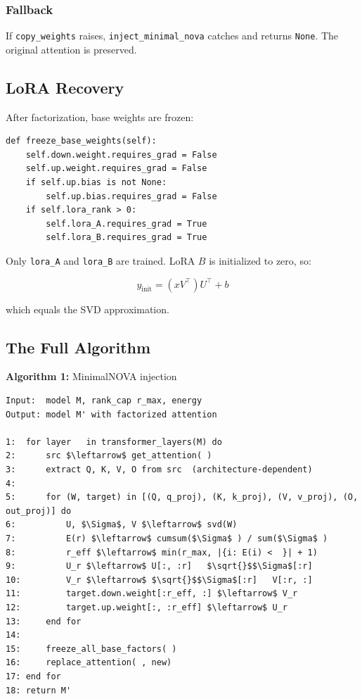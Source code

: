 \subsubsection{Fallback}

If \texttt{copy\_weights} raises, \texttt{inject\_minimal\_nova} catches and returns \texttt{None}. 
The original attention is preserved.

\subsection{LoRA Recovery}

After factorization, base weights are frozen:

\begin{lstlisting}
def freeze_base_weights(self):
    self.down.weight.requires_grad = False
    self.up.weight.requires_grad = False
    if self.up.bias is not None:
        self.up.bias.requires_grad = False
    if self.lora_rank > 0:
        self.lora_A.requires_grad = True
        self.lora_B.requires_grad = True
\end{lstlisting}

Only \texttt{lora\_A} and \texttt{lora\_B} are trained. LoRA $B$ is initialized to zero, so:

\[
y_{\text{init}} = (x V^\top) U^\top + b
\tag{4.8}
\]

which equals the SVD approximation.

\subsection{The Full Algorithm}

\textbf{Algorithm 1:} MinimalNOVA injection
\begin{lstlisting}
Input:  model M, rank_cap r_max, energy  
Output: model M' with factorized attention

1:  for layer   in transformer_layers(M) do
2:      src $\leftarrow$ get_attention( )
3:      extract Q, K, V, O from src  (architecture-dependent)
4:
5:      for (W, target) in [(Q, q_proj), (K, k_proj), (V, v_proj), (O, out_proj)] do
6:          U, $\Sigma$, V $\leftarrow$ svd(W)
7:          E(r) $\leftarrow$ cumsum($\Sigma$ ) / sum($\Sigma$ )
8:          r_eff $\leftarrow$ min(r_max, |{i: E(i) <  }| + 1)
9:          U_r $\leftarrow$ U[:, :r]   $\sqrt{}$$\Sigma$[:r]
10:         V_r $\leftarrow$ $\sqrt{}$$\Sigma$[:r]   V[:r, :]
11:         target.down.weight[:r_eff, :] $\leftarrow$ V_r
12:         target.up.weight[:, :r_eff] $\leftarrow$ U_r
13:     end for
14:
15:     freeze_all_base_factors( )
16:     replace_attention( , new)
17: end for
18: return M'
\end{lstlisting}


